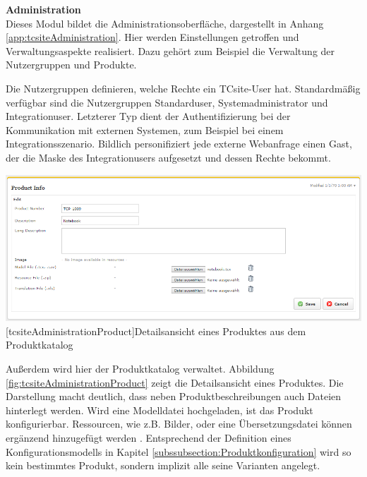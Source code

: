 \documentclass[12pt,a4paper,bibliography=totocnumbered,listof=totoc]{scrartcl}
\begin{document}
\textbf{Administration}\\
Dieses Modul bildet die Administrationsoberfläche, dargestellt in Anhang \ref{app:tcsiteAdministration}. Hier werden Einstellungen getroffen und Verwaltungsaspekte realisiert. Dazu gehört zum Beispiel die Verwaltung der Nutzergruppen und Produkte.

Die Nutzergruppen definieren, welche Rechte ein TCsite-User hat. Standardmäßig verfügbar sind die Nutzergruppen \glqq Standarduser\grqq{}, \glqq Systemadministrator\grqq{} und \glqq Integrationuser\grqq{}. Letzterer Typ dient der Authentifizierung bei der Kommunikation mit externen Systemen, zum Beispiel bei einem Integrationsszenario. Bildlich personifiziert jede externe Webanfrage einen Gast, der die Maske des Integrationusers aufgesetzt und dessen Rechte bekommt.

\vspace{1em}
\begin{minipage}{\linewidth}
	\centering
	\includegraphics[width=0.6\linewidth]{Abbildungen/tcsiteAdministrationProduct.PNG}
	[tcsiteAdministrationProduct]{Detailsansicht eines Produktes aus dem Produktkatalog}
	\label{fig:tcsiteAdministrationProduct}
\end{minipage}
\vspace{1em}

Außerdem wird hier der Produktkatalog verwaltet. Abbildung \ref{fig:tcsiteAdministrationProduct} zeigt die Detailsansicht eines Produktes. Die Darstellung macht deutlich, dass neben Produktbeschreibungen auch Dateien hinterlegt werden. Wird eine Modelldatei hochgeladen, ist das Produkt konfigurierbar. Ressourcen, wie z.B. Bilder, oder eine Übersetzungsdatei können ergänzend hinzugefügt werden \citep{tactonTCsiteReferenceManual}. Entsprechend der Definition eines Konfigurationsmodells in Kapitel \ref{subssubsection:Produktkonfiguration} wird so kein bestimmtes Produkt, sondern implizit alle seine Varianten angelegt.
\end{document}
